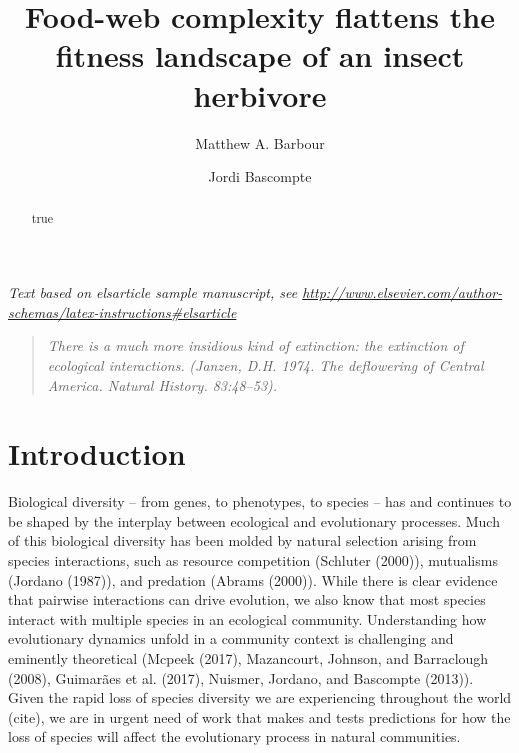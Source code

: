 \documentclass[]{elsarticle} %
\begin{document}
\begin{frontmatter}

  \title{Food-web complexity flattens the fitness landscape of an insect
herbivore}
    \author[Department of Evolutionary Biology and Environmental Studies, University
of Zurich, Zurich, Switzerland]{Matthew A. Barbour}
    \author[Another University]{Jordi Bascompte}
  
      \address[Some Institute of Technology]{Department, Street, City, State, Zip}
    \address[Another University]{Department, Street, City, State, Zip}
  
  \begin{abstract}
  true
  \end{abstract}
  
 \end{frontmatter}

\emph{Text based on elsarticle sample manuscript, see
\url{http://www.elsevier.com/author-schemas/latex-instructions\#elsarticle}}

\begin{quote}
\emph{There is a much more insidious kind of extinction: the extinction
of ecological interactions.} \emph{(Janzen, D.H. 1974. The deflowering
of Central America. Natural History. 83:48--53).}
\end{quote}

\section{Introduction}\label{introduction}

Biological diversity -- from genes, to phenotypes, to species -- has and
continues to be shaped by the interplay between ecological and
evolutionary processes. Much of this biological diversity has been
molded by natural selection arising from species interactions, such as
resource competition (Schluter (2000)), mutualisms (Jordano (1987)), and
predation (Abrams (2000)). While there is clear evidence that pairwise
interactions can drive evolution, we also know that most species
interact with multiple species in an ecological community. Understanding
how evolutionary dynamics unfold in a community context is challenging
and eminently theoretical (Mcpeek (2017), Mazancourt, Johnson, and
Barraclough (2008), Guimarães et al. (2017), Nuismer, Jordano, and
Bascompte (2013)). Given the rapid loss of species diversity we are
experiencing throughout the world (cite), we are in urgent need of work
that makes and tests predictions for how the loss of species will affect
the evolutionary process in natural communities.
\end{document}
